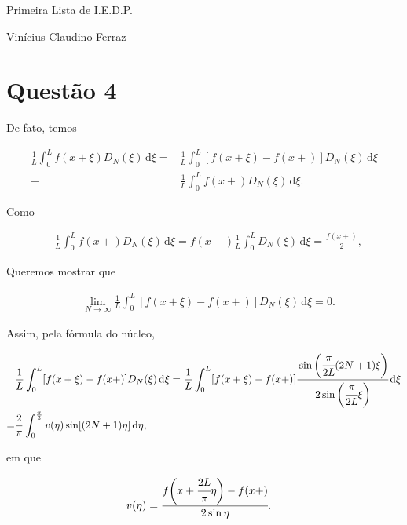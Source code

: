 \documentclass[12pt,a4paper]{article}
\date{}
\begin{document}
	\Large

	\begin{center}
		Primeira Lista de I.E.D.P.

		Vin\'icius Claudino Ferraz
	\end{center}

	\normalsize

	\section{Quest\~ao 4}
		\begin{flushright}
		\end{flushright}

		De fato, temos

		\begin{align}
			\frac{1}{L} \int_0^L f(x + \xi) D_N(\xi)\,\mathrm{d}\xi = &\frac{1}{L} \int_0^L [f(x + \xi) - f(x+)] D_N(\xi)\,\mathrm{d}\xi \\
			+ &\frac{1}{L} \int_0^L f(x+) D_N(\xi)\,\mathrm{d}\xi.
		\end{align}

		Como

		\begin{align}
			&\frac{1}{L} \int_0^L f(x+) D_N(\xi)\,\mathrm{d}\xi = f(x+) \frac{1}{L} \int_0^L D_N(\xi)\,\mathrm{d}\xi = \frac{f(x+)}{2},
		\end{align}

		Queremos mostrar que

		\begin{align}
			&\lim_{N \rightarrow \infty} \frac{1}{L} \int_0^L [f(x + \xi) - f(x+)] D_N(\xi)\,\mathrm{d}\xi = 0.
		\end{align}

		Assim, pela f\'ormula do n\'ucleo,

		\begin{align}
			&\frac{1}{L} \int_0^L [f(x + \xi) - f(x+)] D_N(\xi)\,\mathrm{d}\xi = \frac{1}{L} \int_0^L [f(x + \xi) - f(x+)] \cfrac{\sin\bigg(\cfrac{\pi}{2L}(2N+1)\xi\bigg)}{2\sin\bigg(\cfrac{\pi}{2L}\xi\bigg)} \,\mathrm{d}\xi \\
			= &\frac{2}{\pi} \int_0^{\frac{\pi}{2}} v(\eta) \sin[(2N+1)\eta] \,\mathrm{d}\eta,
		\end{align}

		em que

		\begin{align}
			&v(\eta) = \cfrac{f\bigg(x + \cfrac{2L}{\pi} \eta\bigg) - f(x+)}{2 \sin \eta}.
		\end{align}
\end{document}
